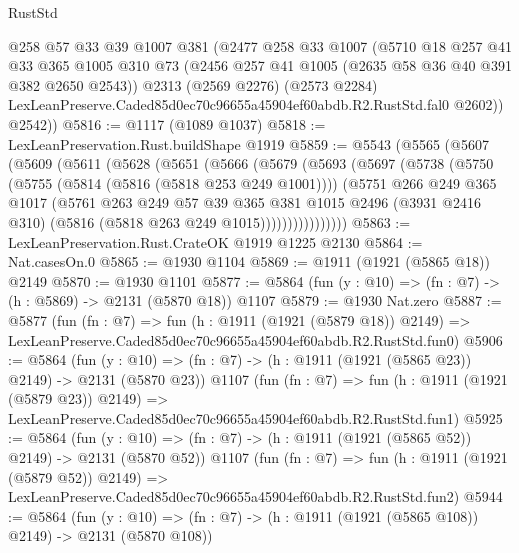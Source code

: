\begin{lexlean}{RustStd}
\begin{coremodule}
        @258
        @57
        @33
        @39
        @1007
        @381
        (@2477
          @258
          @33
          @1007
          (@5710
            @18
            @257
            @41
            @33
            @365
            @1005
            @310
            @73
            (@2456 @257 @41 @1005 (@2635 @58 @36 @40 @391 @382 @2650 @2543))
            @2313
            (@2569 @2276)
            (@2573 @2284)
            LexLeanPreserve.Caded85d0ec70c96655a45904ef60abdb.R2.RustStd.fal0
            @2602))
        @2542))
@5816 := @1117 (@1089 @1037)
@5818 := LexLeanPreservation.Rust.buildShape @1919
@5859 := @5543
    (@5565
      (@5607
        (@5609
          (@5611
            (@5628
              (@5651
                (@5666
                  (@5679
                    (@5693
                      (@5697
                        (@5738
                          (@5750
                            (@5755 (@5814 (@5816 (@5818 @253 @249 @1001))))
                            (@5751
                              @266
                              @249
                              @365
                              @1017
                              (@5761
                                @263
                                @249
                                @57
                                @39
                                @365
                                @381
                                @1015
                                @2496
                                (@3931 @2416 @310)
                                (@5816 (@5818 @263 @249 @1015))))))))))))))))
@5863 := LexLeanPreservation.Rust.CrateOK @1919 @1225 @2130
@5864 := Nat.casesOn.{0}
@5865 := @1930 @1104
@5869 := @1911 (@1921 (@5865 @18)) @2149
@5870 := @1930 @1101
@5877 := @5864 (fun (y : @10) => (fn : @7) -> (h : @5869) -> @2131 (@5870 @18)) @1107
@5879 := @1930 Nat.zero
@5887 := @5877
    (fun (fn : @7) =>
    fun (h : @1911 (@1921 (@5879 @18)) @2149) =>
    LexLeanPreserve.Caded85d0ec70c96655a45904ef60abdb.R2.RustStd.fun0)
@5906 := @5864
    (fun (y : @10) => (fn : @7) -> (h : @1911 (@1921 (@5865 @23)) @2149) -> @2131 (@5870 @23))
    @1107
    (fun (fn : @7) =>
    fun (h : @1911 (@1921 (@5879 @23)) @2149) =>
    LexLeanPreserve.Caded85d0ec70c96655a45904ef60abdb.R2.RustStd.fun1)
@5925 := @5864
    (fun (y : @10) => (fn : @7) -> (h : @1911 (@1921 (@5865 @52)) @2149) -> @2131 (@5870 @52))
    @1107
    (fun (fn : @7) =>
    fun (h : @1911 (@1921 (@5879 @52)) @2149) =>
    LexLeanPreserve.Caded85d0ec70c96655a45904ef60abdb.R2.RustStd.fun2)
@5944 := @5864
    (fun (y : @10) => (fn : @7) -> (h : @1911 (@1921 (@5865 @108)) @2149) -> @2131 (@5870 @108))

\end{coremodule}
\end{lexlean}
